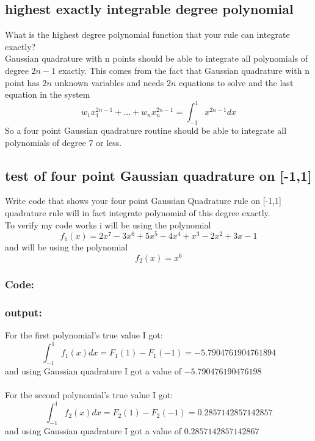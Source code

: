 \documentclass{article}
\begin{document}
\subsection{highest exactly integrable degree polynomial}
	What is the highest degree polynomial function that your rule can integrate exactly?
	\\Gaussian quadrature with n points should be able to integrate all polynomials of degree $2n-1$ exactly. This comes from the fact that Gaussian quadrature with n point has $2n$ unknown variables and needs $2n$ equations to solve and the last equation in the system  $$ w_1x_1^{2n-1} + ... +w_nx_n^{2n-1} = \int_{-1}^{1}x^{2n-1}dx$$ So a four point Gaussian quadrature routine should be able to integrate all polynomials of degree 7 or less.  
\subsection{test of four point Gaussian quadrature on [-1,1]}
	Write code that shows your four point Gaussian Quadrature rule on [-1,1] quadrature rule will in fact integrate polynomial of this degree exactly.
	\\To verify my code works i will be using the polynomial $$f_1(x)=2x^7 - 3x^6 + 5x^5 - 4x^4 + x^3 - 2x^2 + 3x - 1$$ and will be using the polynomial $$f_2(x)= x^6 $$
	\subsubsection*{Code:}
		
	\subsubsection{output:}
		For the first polynomial's true value I got:$$\int_{-1}^{1}f_1(x)dx= F_1(1)-F_1(-1)=-5.7904761904761894$$ 
		and using Gaussian quadrature I got a value of $-5.790476190476198$ \\\\
		For the second polynomial's true value I got:$$\int_{-1}^{1}f_2(x)dx= F_2(1)-F_2(-1)=0.2857142857142857$$ 
		and using Gaussian quadrature I got a value of $0.2857142857142867$ \\
\end{document}
